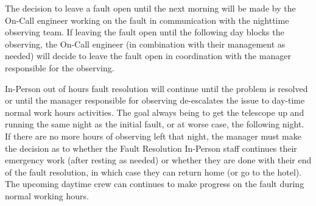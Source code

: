 The decision to leave a fault open until the next morning will be made by the On-Call engineer working on the fault in communication with the nighttime observing team. If leaving the fault open until the following day blocks the observing, the On-Call engineer (in combination with their management as needed) will decide to leave the fault open in coordination with the manager responsible for the observing.

In-Person out of hours fault resolution will continue until the problem is resolved or until the manager responsible for observing de-escalates the issue to day-time normal work hours activities.  The goal always being to get the telescope up and running the same night as the initial fault, or at worse case, the following night.  If there are no more hours of observing left that night, the manager must make the decision as to whether the Fault Resolution In-Person staff continues their emergency work (after resting as needed) or whether they are done with their end of the fault resolution, in which case they can return home (or go to the hotel).  The upcoming daytime crew can continues to make progress on the fault during normal working hours.



